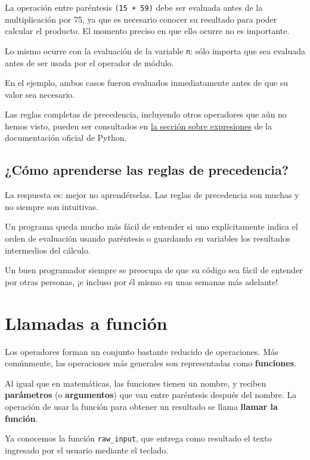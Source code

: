 La operación entre paréntesis \lstinline!(15 + 59)! debe ser evaluada
antes de la multiplicación por 75, ya que es necesario conocer su
resultado para poder calcular el producto. El momento preciso en que
ello ocurre no es importante.

Lo mismo ocurre con la evaluación de la variable \lstinline!n!: sólo
importa que sea evaluada antes de ser usada por el operador de módulo.

En el ejemplo, ambos casos fueron evaluados inmediatamente antes de que
su valor sea necesario.

Las reglas completas de precedencia, incluyendo otros operadores que aún
no hemos visto, pueden ser consultados en
\href{http://docs.python.org/reference/expressions.html\#summary}{la
sección sobre expresiones} de la documentación oficial de Python.

\subsection{¿Cómo aprenderse las reglas de precedencia?}

La respuesta es: mejor no aprendérselas. Las reglas de precedencia son
muchas y no siempre son intuitivas.

Un programa queda mucho más fácil de entender si uno explícitamente
indica el orden de evaluación usando paréntesis o guardando en variables
los resultados intermedios del cálculo.

Un buen programador siempre se preocupa de que su código sea fácil de
entender por otras personas, ¡e incluso por él mismo en unas semanas más
adelante!

\section{Llamadas a función}

Los operadores forman un conjunto bastante reducido de operaciones. Más
comúnmente, las operaciones más generales son representadas como
\textbf{funciones}.

Al igual que en matemáticas, las funciones tienen un nombre, y reciben
\textbf{parámetros} (o \textbf{argumentos}) que van entre paréntesis
después del nombre. La operación de usar la función para obtener un
resultado se llama \textbf{llamar la función}.

Ya conocemos la función \lstinline!raw_input!, que entrega como
resultado el texto ingresado por el usuario mediante el teclado.

